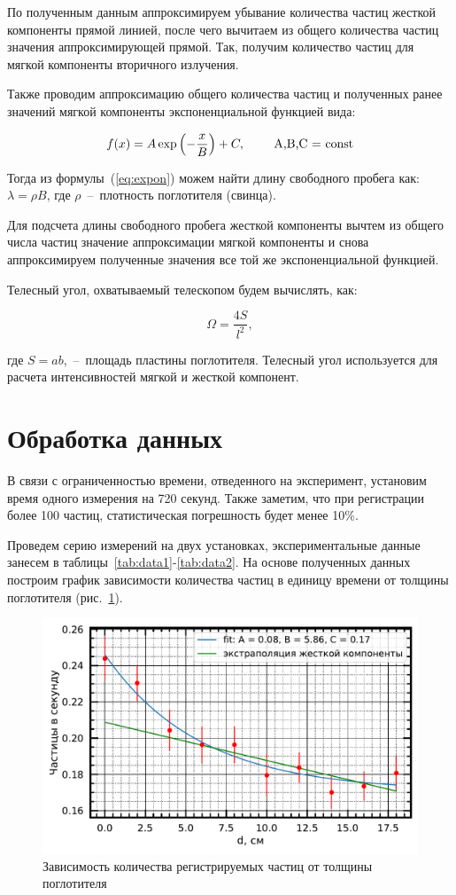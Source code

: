 \documentclass[reprint, nofootinbib, nobalancelastpage, 10pt]{revtex4-2}
\begin{document}
По полученным данным аппроксимируем убывание количества частиц жесткой компоненты прямой
линией, после чего вычитаем из общего количества частиц значения аппроксимирующей прямой.
Так, получим количество частиц для мягкой компоненты вторичного излучения.

Также проводим аппроксимацию общего количества частиц и полученных ранее значений мягкой
компоненты экспоненциальной функцией вида:

\[ f(x) = A \exp \left(-\frac{x}{B} \right) + C,\text{\hspace*{20pt} A,B,C = const} \]

Тогда из формулы~(\ref{eq:expon}) можем найти длину свободного пробега как:
$\lambda = \rho B$, где $\rho$~--~плотность поглотителя (свинца).

Для подсчета длины свободного пробега жесткой компоненты вычтем из общего числа частиц
значение аппроксимации мягкой компоненты и снова аппроксимируем полученные значения все
той же экспоненциальной функцией.

Телесный угол, охватываемый телескопом будем вычислять, как:

\[ \Omega = \dfrac{4S}{l^2}, \]

где $S = ab$,~--~площадь пластины поглотителя. Телесный угол используется для расчета
интенсивностей мягкой и жесткой компонент.


\section*{Обработка данных}

В связи с ограниченностью времени, отведенного на эксперимент, установим время одного
измерения на 720 секунд. Также заметим, что при регистрации более 100 частиц,
статистическая погрешность будет менее 10\%.

Проведем серию измерений на двух установках, экспериментальные данные занесем в
таблицы~\ref{tab:data1}-\ref{tab:data2}. На основе полученных данных построим график
зависимости количества частиц в единицу времени от толщины поглотителя
(рис.~\ref{graph:gnrl}).

\begin{figure}[h!]
	\includegraphics[width=0.95\linewidth]{plot_1.pdf}
	\caption{Зависимость количества регистрируемых частиц от толщины поглотителя}
	\label{graph:gnrl}
\end{figure}
\end{document}
